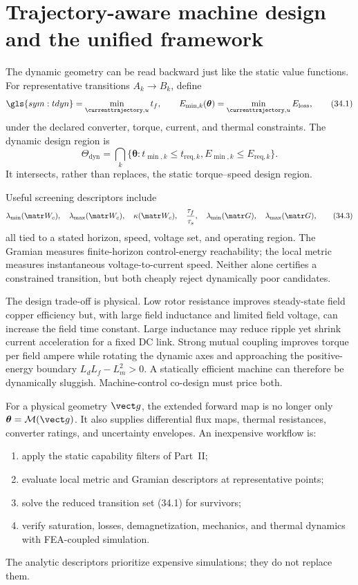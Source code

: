 \section{Trajectory-aware machine design and the unified framework}
\label{sec:dynamic-design}

The dynamic geometry can be read backward just like the static value
functions.  For representative transitions \(A_k\rightarrow B_k\), define
\[
 \gls{sym:tdyn}=\min_{\currenttrajectory,u}t_f,
 \qquad
 E_{\min,k}(\boldsymbol\theta)=\min_{\currenttrajectory,u}E_{\mathrm{loss}},
 \tag{34.1}
\]
under the declared converter, torque, current, and thermal constraints.  The
dynamic design region is
\[
 \Theta_{\mathrm{dyn}}=\bigcap_k
 \{\boldsymbol\theta:t_{\min,k}\leq t_{\mathrm{req},k},
 E_{\min,k}\leq E_{\mathrm{req},k}\}.
 \tag{34.2}
\]
It intersects, rather than replaces, the static torque--speed design region.

Useful screening descriptors include
\[
 \lambda_{\min}(\matr W_c),\quad
 \lambda_{\max}(\matr W_c),\quad
 \kappa(\matr W_c),\quad
 \frac{\tau_f}{\tau_s},\quad
 \lambda_{\min}(\matr G),\quad
 \lambda_{\max}(\matr G),
 \tag{34.3}
\]
all tied to a stated horizon, speed, voltage set, and operating region.  The
Gramian measures finite-horizon control-energy reachability; the local metric
measures instantaneous voltage-to-current speed.  Neither alone certifies a
constrained transition, but both cheaply reject dynamically poor candidates.



The design trade-off is physical.  Low rotor resistance improves steady-state
field copper efficiency but, with large field inductance and limited field
voltage, can increase the field time constant.  Large inductance may reduce
ripple yet shrink current acceleration for a fixed DC link.  Strong mutual
coupling improves torque per field ampere while rotating the dynamic axes and
approaching the positive-energy boundary
\(L_dL_f-L_m^2>0\).  A statically efficient machine can therefore be
dynamically sluggish.  Machine-control co-design must price both.

For a physical geometry \(\vect g\), the extended forward map is no longer
only \(\boldsymbol\theta=\mathcal M(\vect g)\).  It also supplies differential
flux maps, thermal resistances, converter ratings, and uncertainty envelopes.
An inexpensive workflow is:
\begin{enumerate}
 \item apply the static capability filters of Part~II;
 \item evaluate local metric and Gramian descriptors at representative points;
 \item solve the reduced transition set (34.1) for survivors;
 \item verify saturation, losses, demagnetization, mechanics, and thermal
 dynamics with FEA-coupled simulation.
\end{enumerate}
The analytic descriptors prioritize expensive simulations; they do not
replace them.

